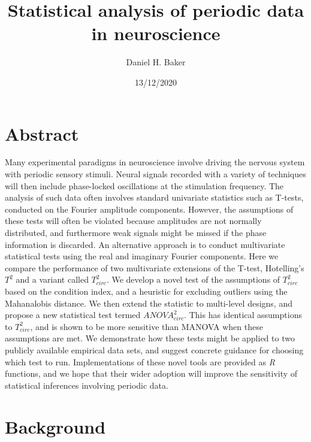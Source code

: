 \documentclass[]{article}
\title{Statistical analysis of periodic data in neuroscience}
\author{Daniel H. Baker}
\date{13/12/2020}
\begin{document}
\maketitle

\hypertarget{abstract}{%
\section{Abstract}\label{abstract}}

Many experimental paradigms in neuroscience involve driving the nervous system with periodic sensory stimuli. Neural signals recorded with a variety of techniques will then include phase-locked oscillations at the stimulation frequency. The analysis of such data often involves standard univariate statistics such as T-tests, conducted on the Fourier amplitude components. However, the assumptions of these tests will often be violated because amplitudes are not normally distributed, and furthermore weak signals might be missed if the phase information is discarded. An alternative approach is to conduct multivariate statistical tests using the real and imaginary Fourier components. Here we compare the performance of two multivariate extensions of the T-test, Hotelling's \(T^2\) and a variant called \(T^2_{circ}\). We develop a novel test of the assumptions of \(T^2_{circ}\) based on the condition index, and a heuristic for excluding outliers using the Mahanalobis distance. We then extend the statistic to multi-level designs, and propose a new statistical test termed \(ANOVA^2_{circ}\). This has identical assumptions to \(T^2_{circ}\), and is shown to be more sensitive than MANOVA when these assumptions are met. We demonstrate how these tests might be applied to two publicly available empirical data sets, and suggest concrete guidance for choosing which test to run. Implementations of these novel tools are provided as \emph{R} functions, and we hope that their wider adoption will improve the sensitivity of statistical inferences involving periodic data.

\hypertarget{background}{%
\section{Background}\label{background}}
\end{document}
